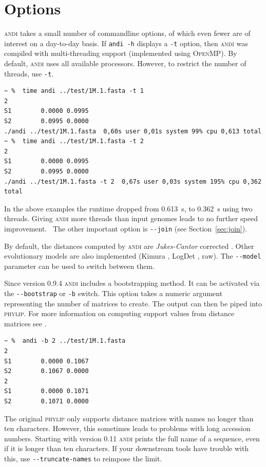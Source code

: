 \documentclass[a4paper,
  10pt,
  english,
  DIV=12,
  BCOR=8mm]{scrbook}
\newcommand{\algo}[1]{\textsc{{#1}}}
\newcommand{\andi}{\algo{andi}\xspace}
\begin{document}
\section{Options} \label{sec:options}

\andi takes a small number of commandline options, of which even fewer are of interest on a day-to-day basis. If \lstinline$andi -h$ displays a \lstinline$-t$ option, then \andi was compiled with multi-threading support (implemented using \algo{OpenMP}). By default, \andi uses all available processors. However, to restrict the number of threads, use \lstinline$-t$.

\begin{lstlisting}
~ %  time andi ../test/1M.1.fasta -t 1
2
S1        0.0000 0.0995
S2        0.0995 0.0000
./andi ../test/1M.1.fasta  0,60s user 0,01s system 99% cpu 0,613 total
~ %  time andi ../test/1M.1.fasta -t 2
2
S1        0.0000 0.0995
S2        0.0995 0.0000
./andi ../test/1M.1.fasta -t 2  0,67s user 0,03s system 195% cpu 0,362 total
\end{lstlisting}

In the above examples the runtime dropped from \SI{0.613}{\second}, to \SI{0.362}{\second} using two threads. Giving \andi more threads than input genomes leads to no further speed improvement. \, The other important option is \lstinline$--join$ (see Section~\ref{sec:join}).

By default, the distances computed by \andi are \emph{Jukes-Cantor} corrected \cite{jukescantor}. Other evolutionary models are also implemented (Kimura \cite{kimura}, LogDet \cite{logdet}, raw). The \lstinline$--model$ parameter can be used to switch between them.

Since version 0.9.4 \andi includes a bootstrapping method. It can be activated via the \lstinline$--bootstrap$ or \lstinline$-b$ switch. This option takes a numeric argument representing the number of matrices to create. The output can then be piped into \algo{phylip}. For more information on computing support values from distance matrices see \cite{afra}.

\begin{lstlisting}
~ %  andi -b 2 ../test/1M.1.fasta
2
S1        0.0000 0.1067
S2        0.1067 0.0000
2
S1        0.0000 0.1071
S2        0.1071 0.0000
\end{lstlisting}

The original \algo{phylip} only supports distance matrices with names no longer than ten characters. However, this sometimes leads to problems with long accession numbers. Starting with version 0.11 \andi prints the full name of a sequence, even if it is longer than ten characters. If your downstream tools have trouble with this, use \lstinline$--truncate-names$ to reimpose the limit.
\end{document}
